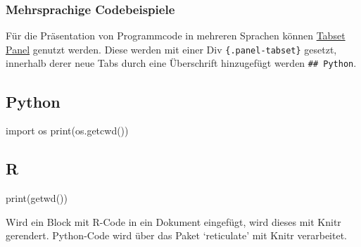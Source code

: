 \documentclass[
  letterpaper,
  DIV=11]{scrartcl}
\newenvironment{Shaded}{\begin{snugshade}}{\end{snugshade}}
\newcommand{\BuiltInTok}[1]{\textcolor[rgb]{0.00,0.23,0.31}{#1}}
\newcommand{\FunctionTok}[1]{\textcolor[rgb]{0.28,0.35,0.67}{#1}}
\newcommand{\ImportTok}[1]{\textcolor[rgb]{0.00,0.46,0.62}{#1}}
\newcommand{\NormalTok}[1]{\textcolor[rgb]{0.00,0.23,0.31}{#1}}
\begin{document}
\subsubsection{Mehrsprachige
Codebeispiele}\label{mehrsprachige-codebeispiele}

Für die Präsentation von Programmcode in mehreren Sprachen können
\href{https://quarto.org/docs/interactive/layout.html\#tabset-panel}{Tabset
Panel} genutzt werden. Diese werden mit einer Div
\texttt{\{.panel-tabset\}} gesetzt, innerhalb derer neue Tabs durch eine
Überschrift hinzugefügt werden \texttt{\#\#\ Python}.

\subsection{Python}

\begin{Shaded}
\begin{Highlighting}[]
\ImportTok{import}\NormalTok{ os}
\BuiltInTok{print}\NormalTok{(os.getcwd())}
\end{Highlighting}
\end{Shaded}

\subsection{R}

\begin{Shaded}
\begin{Highlighting}[]
\FunctionTok{print}\NormalTok{(}\FunctionTok{getwd}\NormalTok{())}
\end{Highlighting}
\end{Shaded}

\begin{tcolorbox}[enhanced jigsaw, rightrule=.15mm, bottomtitle=1mm, left=2mm, coltitle=black, opacitybacktitle=0.6, breakable, leftrule=.75mm, opacityback=0, colframe=quarto-callout-tip-color-frame, toprule=.15mm, toptitle=1mm, titlerule=0mm, colbacktitle=quarto-callout-tip-color!10!white, colback=white, title=\textcolor{quarto-callout-tip-color}{\faLightbulb}\hspace{0.5em}{Zusammenspiel von Python und R in Quarto}, arc=.35mm, bottomrule=.15mm]

Wird ein Block mit R-Code in ein Dokument eingefügt, wird dieses mit
Knitr gerendert. Python-Code wird über das Paket `reticulate' mit Knitr
verarbeitet.

\end{tcolorbox}
\end{document}
